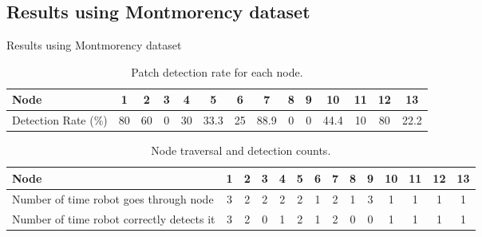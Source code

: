 \documentclass[aspectratio=169,hyperref={pdfpagelabels=false}]{beamer}
\begin{document}
    \subsection{Results using Montmorency dataset}
    \begin{frame}{Results using Montmorency dataset}
        \begin{adjustwidth}{-3.5em}{-1.5em}
            \begin{table}[ht!]
                \centering
                \begin{tabular}{|>{\raggedright\arraybackslash}p{2.5cm}|c|c|c|c|c|c|c|c|c|c|c|c|c|}
                    \hline
                    Node                & 1  & 2  & 3 & 4  & 5    & 6  & 7    & 8 & 9 & 10   & 11 & 12 & 13   \\ \hline
                    Detection Rate (\%) & 80 & 60 & 0 & 30 & 33.3 & 25 & 88.9 & 0 & 0 & 44.4 & 10 & 80 & 22.2 \\ \hline
                \end{tabular}
                \caption{Patch detection rate for each node.}
            \end{table}%
            \begin{table}[ht]
                \centering
                \begin{tabular}{|>{\raggedright\arraybackslash}p{4cm}|c|c|c|c|c|c|c|c|c|c|c|c|c|}
                    \hline
                    Node                                      & 1 & 2 & 3 & 4 & 5 & 6 & 7 & 8 & 9 & 10 & 11 & 12 & 13 \\ \hline
                    Number of time robot goes through node    & 3 & 2 & 2 & 2 & 2 & 1 & 2 & 1 & 3 & 1  & 1  & 1  & 1  \\ \hline
                    Number of time robot correctly detects it & 3 & 2 & 0 & 1 & 2 & 1 & 2 & 0 & 0 & 1  & 1  & 1  & 1  \\ \hline
                \end{tabular}
                \caption{Node traversal and detection counts.}
            \end{table}%
        \end{adjustwidth}
    \end{frame}
\end{document}
